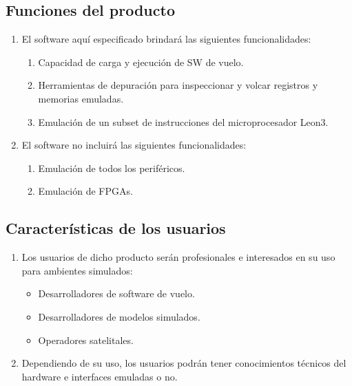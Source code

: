 \documentclass[
  11pt, %
  codirector, %
]{charter}
\begin{document}
\vspace{25px}


\subsection{Funciones del producto}
\label{sec:orgaf51da6}

\begin{enumerate}
\item El software aquí especificado brindará las siguientes funcionalidades:
  \begin{enumerate}
  \item Capacidad de carga y ejecución de SW de vuelo.
  \item Herramientas de depuración para inspeccionar y volcar registros y memorias emuladas.
  \item Emulación de un subset de instrucciones del microprocesador Leon3.
  \end{enumerate}
\item El software no incluirá las siguientes funcionalidades:
  \begin{enumerate}
  \item Emulación de todos los periféricos.
  \item Emulación de FPGAs.
  \end{enumerate}

\end{enumerate}



\subsection{Características de los usuarios}
\label{sec:orga40b0ee}

\begin{enumerate}
\item Los usuarios de dicho producto serán profesionales e interesados en su uso para ambientes simulados:
  \begin{itemize}
  \item Desarrolladores de software de vuelo.
  \item Desarrolladores de modelos simulados.
  \item Operadores satelitales.
  \end{itemize}
\item Dependiendo de su uso, los usuarios podrán tener conocimientos técnicos del hardware e interfaces emuladas o no.
\end{enumerate}
\end{document}
